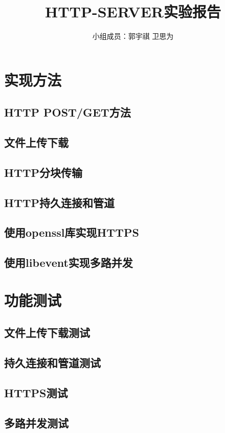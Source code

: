\documentclass[a4paper]{article}
\begin{document}
 
\title{HTTP-SERVER实验报告}
\author{小组成员：郭宇祺 \; 卫思为}
\date{}
\maketitle
\normalsize
\section{实现方法}
\subsection{HTTP POST/GET方法}

\subsection{文件上传下载}

\subsection{HTTP分块传输}

\subsection{HTTP持久连接和管道}

\subsection{使用openssl库实现HTTPS}

\subsection{使用libevent实现多路并发}

\section{功能测试}
\subsection{文件上传下载测试}

\subsection{持久连接和管道测试}

\subsection{HTTPS测试}

\subsection{多路并发测试}
\end{document}
